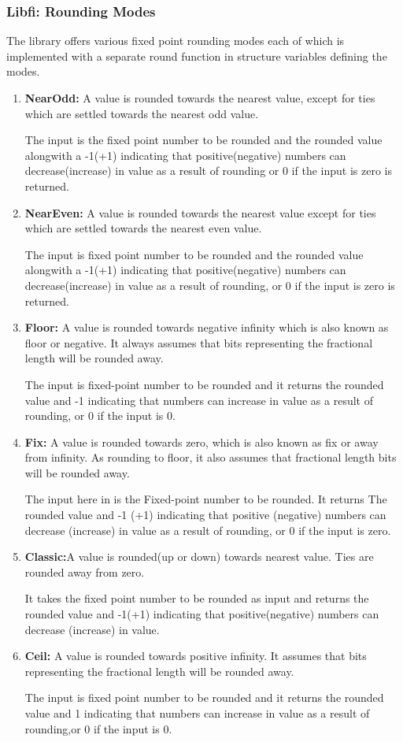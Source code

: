 \subsubsection{Libfi: Rounding Modes}\label{Rounding Modes Section}
The library offers various fixed point rounding modes each of which is implemented with a separate round function in structure variables defining the modes.
\begin{enumerate}
\item
\textbf{NearOdd:} A value is rounded towards the nearest value, except for ties which are settled towards the nearest odd value.

\noindent The input is the fixed point number to be rounded and the rounded value alongwith a -1(+1) indicating that positive(negative) numbers can decrease(increase) in value as a result of rounding or 0 if the input is zero is returned.
\item
\textbf{NearEven:} A value is rounded towards the nearest value except for ties which are settled towards the nearest even value.

\noindent The input is fixed point number to be rounded and the rounded value alongwith a -1(+1) indicating that positive(negative) numbers can decrease(increase) in value as a result of rounding, or 0 if the input is zero is returned.
\item
\textbf{Floor:} A value is rounded towards negative infinity which  is also known as floor or negative. It always assumes that bits representing the fractional length will be rounded away.

\noindent The input is fixed-point number to be rounded and it returns the rounded value and -1 indicating that numbers can increase in value as a result of rounding, or 0 if the input is 0.
\item
\textbf{Fix:} A value is rounded towards zero, which is also known as fix or away from infinity. As rounding to floor, it also assumes that fractional length bits will be rounded away.

\noindent The input here in is the Fixed-point number to be rounded. It returns The rounded value and -1 (+1) indicating that positive (negative) numbers can decrease (increase) in value as a result of rounding, or 0 if the input is zero.	
\item
\textbf{Classic:}A value is rounded(up or down) towards nearest value. Ties are rounded away from zero.

\noindent It takes the fixed point number to be rounded as input and returns the rounded value and -1(+1) indicating that positive(negative) numbers can decrease (increase) in value.

\item
\textbf{Ceil:} A value is rounded towards positive infinity. It assumes that bits representing the fractional length will be rounded away.

\noindent The input is fixed point number to be rounded and it returns the rounded value and 1 indicating that numbers can increase in value as a result of rounding,or 0 if the input is 0.
\end{enumerate}

